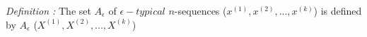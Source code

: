 \documentclass[preview]{standalone}
\begin{document}
\begin{center}
\textit{Definition :} The set $A_{\epsilon}$ of $\epsilon -typical$ $n$-sequences ($x^{(1)},x^{(2)},...,x^{(k)}$) is defined by $A_{\epsilon}$ ($X^{(1)},X^{(2)},...,X^{(k)}$)
\end{center}
\end{document}
